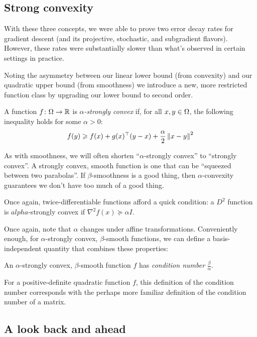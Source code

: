 \subsection{Strong convexity}

With these three concepts, we were able to prove two error decay rates for
gradient descent (and its projective, stochastic, and subgradient flavors).
However, these rates were substantially slower than what's observed in certain
settings in practice.

Noting the asymmetry between our linear lower bound (from convexity) and our
quadratic upper bound (from smoothness) we introduce a new, more restricted
function class by upgrading our lower bound to second order.

\begin{definition}
A function $f\colon\Omega\to\mathbb{R}$
is \emph{$\alpha$-strongly convex}
if, for all $x,y\in\Omega$,
the following inequality holds
for some $\alpha>0$:
\[
f(y) \geqslant f(x) + g(x)^\top(y-x) + \frac{\alpha}{2}\left\lVert x-y\right\rVert^2
\]
\end{definition}

As with smoothness, we will often shorten ``$\alpha$-strongly convex'' to
``strongly convex''.  A strongly convex, smooth function is one that can be
``squeezed between two parabolas''.  If $\beta$-smoothness is a good thing, then
$\alpha$-convexity guarantees we don't have too much of a good thing.

Once again, twice-differentiable functions afford a quick condition: a $D^2$
function is $alpha$-strongly convex if $\nabla^2f(x) \succeq \alpha I$.

Once again, note that $\alpha$ changes under affine transformations.
Conveniently enough, for $\alpha$-strongly convex, $\beta$-smooth functions, we
can define a basis-independent quantity that combines these properties:

\begin{definition}
An $\alpha$-strongly convex, $\beta$-smooth function $f$
has \emph{condition number} $\frac{\beta}{\alpha}$.
\end{definition}

For a positive-definite quadratic function $f$, this definition of the condition
number corresponds with the perhaps more familiar definition of the condition
number of a matrix.

\subsection{A look back and ahead}

